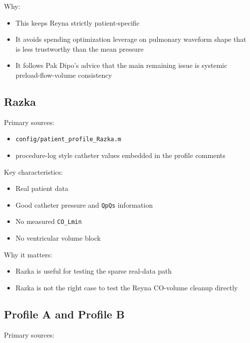 \documentclass[11pt,a4paper]{article}
\begin{document}
Why:

\begin{itemize}[leftmargin=1.5em]
    \item This keeps Reyna strictly patient-specific
    \item It avoids spending optimization leverage on pulmonary waveform shape
    that is less trustworthy than the mean pressure
    \item It follows Pak Dipo's advice that the main remaining issue is
    systemic preload-flow-volume consistency
\end{itemize}

\subsection{Razka}

Primary sources:

\begin{itemize}[leftmargin=1.5em]
    \item \texttt{config/patient\_profile\_Razka.m}
    \item procedure-log style catheter values embedded in the profile comments
\end{itemize}

Key characteristics:

\begin{itemize}[leftmargin=1.5em]
    \item Real patient data
    \item Good catheter pressure and \texttt{QpQs} information
    \item No measured \texttt{CO\_Lmin}
    \item No ventricular volume block
\end{itemize}

Why it matters:

\begin{itemize}[leftmargin=1.5em]
    \item Razka is useful for testing the sparse real-data path
    \item Razka is not the right case to test the Reyna CO-volume cleanup directly
\end{itemize}

\subsection{Profile A and Profile B}

Primary sources:
\end{document}
